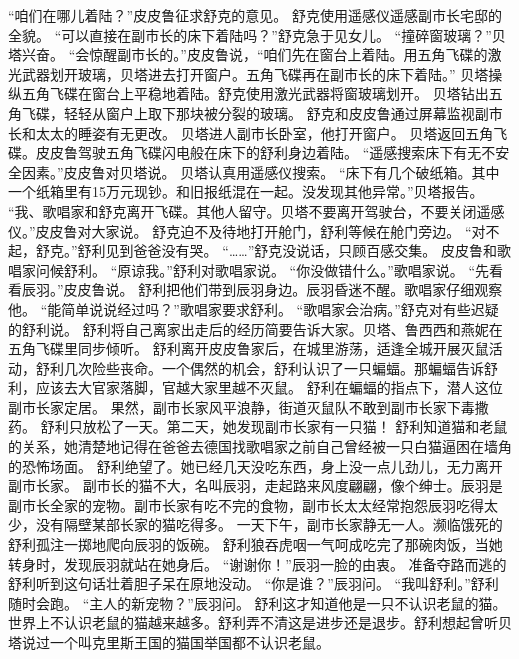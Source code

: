 \documentclass[a4paper,12pt,UTF8,twoside]{ctexbook}
\begin{document}
        “咱们在哪儿着陆？”皮皮鲁征求舒克的意见。  
        舒克使用遥感仪遥感副市长宅邸的全貌。  
        “可以直接在副市长的床下着陆吗？”舒克急于见女儿。  
        “撞碎窗玻璃？”贝塔兴奋。  
        “会惊醒副市长的。”皮皮鲁说，“咱们先在窗台上着陆。用五角飞碟的激光武器划开玻璃，贝塔进去打开窗户。五角飞碟再在副市长的床下着陆。”  
        贝塔操纵五角飞碟在窗台上平稳地着陆。舒克使用激光武器将窗玻璃划开。  
        贝塔钻出五角飞碟，轻轻从窗户上取下那块被分裂的玻璃。  
        舒克和皮皮鲁通过屏幕监视副市长和太太的睡姿有无更改。  
        贝塔进人副市长卧室，他打开窗户。  
        贝塔返回五角飞碟。皮皮鲁驾驶五角飞碟闪电般在床下的舒利身边着陆。  
        “遥感搜索床下有无不安全因素。”皮皮鲁对贝塔说。  
        贝塔认真用遥感仪搜索。  
        “床下有几个破纸箱。其中一个纸箱里有15万元现钞。和旧报纸混在一起。没发现其他异常。”贝塔报告。  
        “我、歌唱家和舒克离开飞碟。其他人留守。贝塔不要离开驾驶台，不要关闭遥感仪。”皮皮鲁对大家说。  
        舒克迫不及待地打开舱门，舒利等候在舱门旁边。  
        “对不起，舒克。”舒利见到爸爸没有哭。  
        “……”舒克没说话，只顾百感交集。  
        皮皮鲁和歌唱家问候舒利。  
        “原谅我。”舒利对歌唱家说。  
        “你没做错什么。”歌唱家说。  
        “先看看辰羽。”皮皮鲁说。  
        舒利把他们带到辰羽身边。辰羽昏迷不醒。歌唱家仔细观察他。  
        “能简单说说经过吗？”歌唱家要求舒利。  
        “歌唱家会治病。”舒克对有些迟疑的舒利说。  
        舒利将自己离家出走后的经历简要告诉大家。贝塔、鲁西西和燕妮在五角飞碟里同步倾听。  
        舒利离开皮皮鲁家后，在城里游荡，适逢全城开展灭鼠活动，舒利几次险些丧命。一个偶然的机会，舒利认识了一只蝙蝠。那蝙蝠告诉舒利，应该去大官家落脚，官越大家里越不灭鼠。  
        舒利在蝙蝠的指点下，潜人这位副市长家定居。  
        果然，副市长家风平浪静，街道灭鼠队不敢到副市长家下毒撒药。  
        舒利只放松了一天。第二天，她发现副市长家有一只猫！  
        舒利知道猫和老鼠的关系，她清楚地记得在爸爸去德国找歌唱家之前自己曾经被一只白猫逼困在墙角的恐怖场面。  
        舒利绝望了。她已经几天没吃东西，身上没一点儿劲儿，无力离开副市长家。  
        副市长的猫不大，名叫辰羽，走起路来风度翩翩，像个绅士。辰羽是副市长全家的宠物。副市长家有吃不完的食物，副市长太太经常抱怨辰羽吃得太少，没有隔壁某部长家的猫吃得多。  
        一天下午，副市长家静无一人。濒临饿死的舒利孤注一掷地爬向辰羽的饭碗。  
        舒利狼吞虎咽一气呵成吃完了那碗肉饭，当她转身时，发现辰羽就站在她身后。  
        “谢谢你！”辰羽一脸的由衷。  
        准备夺路而逃的舒利听到这句话壮着胆子呆在原地没动。  
        “你是谁？”辰羽问。  
        “我叫舒利。”舒利随时会跑。  
        “主人的新宠物？”辰羽问。  
        舒利这才知道他是一只不认识老鼠的猫。世界上不认识老鼠的猫越来越多。舒利弄不清这是进步还是退步。舒利想起曾听贝塔说过一个叫克里斯王国的猫国举国都不认识老鼠。  
\end{document}
